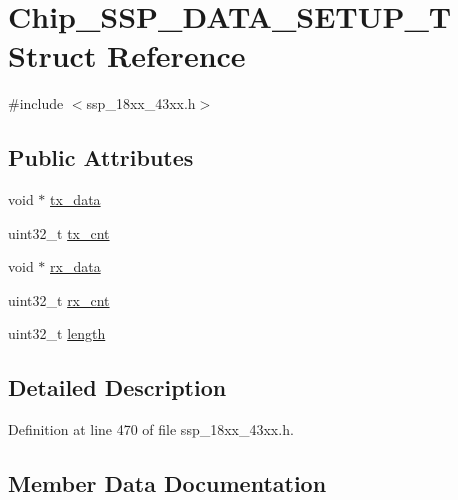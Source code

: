 \hypertarget{struct_chip___s_s_p___d_a_t_a___s_e_t_u_p___t}{}\section{Chip\+\_\+\+S\+S\+P\+\_\+\+D\+A\+T\+A\+\_\+\+S\+E\+T\+U\+P\+\_\+T Struct Reference}
\label{struct_chip___s_s_p___d_a_t_a___s_e_t_u_p___t}


{\ttfamily \#include $<$ssp\+\_\+18xx\+\_\+43xx.\+h$>$}

\subsection*{Public Attributes}
\begin{DoxyCompactItemize}
\item 
void $\ast$ \hyperlink{struct_chip___s_s_p___d_a_t_a___s_e_t_u_p___t_a490e82f2648097f22faa108b59d89848}{tx\+\_\+data}
\item 
uint32\+\_\+t \hyperlink{struct_chip___s_s_p___d_a_t_a___s_e_t_u_p___t_ab37848675426612b2fd0e986dbd2d260}{tx\+\_\+cnt}
\item 
void $\ast$ \hyperlink{struct_chip___s_s_p___d_a_t_a___s_e_t_u_p___t_a06371dd1c78e3cb326a2ccc2811f0346}{rx\+\_\+data}
\item 
uint32\+\_\+t \hyperlink{struct_chip___s_s_p___d_a_t_a___s_e_t_u_p___t_a74d6f8529c17e5e1ce7e78cdeb1a39b4}{rx\+\_\+cnt}
\item 
uint32\+\_\+t \hyperlink{struct_chip___s_s_p___d_a_t_a___s_e_t_u_p___t_ac5202ff04a3ed639dce258e31a9000d6}{length}
\end{DoxyCompactItemize}


\subsection{Detailed Description}


Definition at line 470 of file ssp\+\_\+18xx\+\_\+43xx.\+h.



\subsection{Member Data Documentation}
\mbox{\label{struct_chip___s_s_p___d_a_t_a___s_e_t_u_p___t_ac5202ff04a3ed639dce258e31a9000d6}} 
